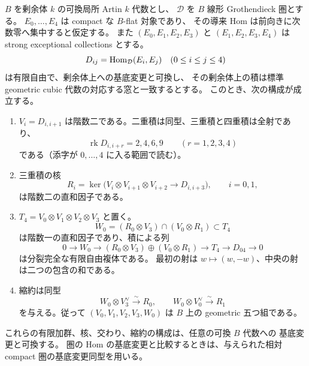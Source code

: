 \begin{lemma}
\label{lem:cubic-artin-overlap-recovery}
$B$ を剰余体 $k$ の可換局所 Artin $k$ 代数とし、
$\mathcal D$ を $B$ 線形 Grothendieck 圏とする。
$E_0,\ldots,E_4$ は compact な $B$-flat 対象であり、
その導来 Hom は前向きに次数零へ集中すると仮定する。
また $(E_0,E_1,E_2,E_3)$ と $(E_1,E_2,E_3,E_4)$ は strong exceptional collections とする。
\[
 D_{ij}=\operatorname{Hom}_{\mathcal D}(E_i,E_j)\quad(0\le i\le j\le4)
\]
は有限自由で、剰余体上への基底変更と可換し、
その剰余体上の積は標準 geometric cubic 代数の対応する窓と一致するとする。
このとき、次の構成が成立する。
\begin{enumerate}
\item $V_i=D_{i,i+1}$ は階数二である。二重積は同型、三重積と四重積は全射であり、
\[
 \operatorname{rk}D_{i,i+r}=2,4,6,9\qquad(r=1,2,3,4)
\]
である（添字が $0,\ldots,4$ に入る範囲で読む）。
\item 三重積の核
\[
 R_i=\ker\bigl(V_i\otimes V_{i+1}\otimes V_{i+2}\longrightarrow D_{i,i+3}\bigr),
 \qquad i=0,1,
\]
は階数二の直和因子である。
\item $T_4=V_0\otimes V_1\otimes V_2\otimes V_3$ と置く。
\[
 W_0=(R_0\otimes V_3)\cap(V_0\otimes R_1)\subset T_4
\]
は階数一の直和因子であり、積による列
\begin{equation}\label{eq:artin-overlap-complex}
0\longrightarrow W_0\longrightarrow
 (R_0\otimes V_3)\oplus(V_0\otimes R_1)
 \longrightarrow T_4\longrightarrow D_{04}\longrightarrow0
\end{equation}
は分裂完全な有限自由複体である。
最初の射は $w\mapsto(w,-w)$、中央の射は二つの包含の和である。
\item 縮約は同型
\begin{equation}\label{eq:artin-contraction-isos}
 W_0\otimes V_3^\vee\xrightarrow{\sim}R_0,
 \qquad
 W_0\otimes V_0^\vee\xrightarrow{\sim}R_1
\end{equation}
を与える。従って $(V_0,V_1,V_2,V_3,W_0)$ は $B$ 上の geometric 五つ組である。
\end{enumerate}
これらの有限加群、核、交わり、縮約の構成は、任意の可換 $B$ 代数への
基底変更と可換する。
圏の Hom の基底変更と比較するときは、与えられた相対 compact 圏の基底変更同型を用いる。
\end{lemma}

